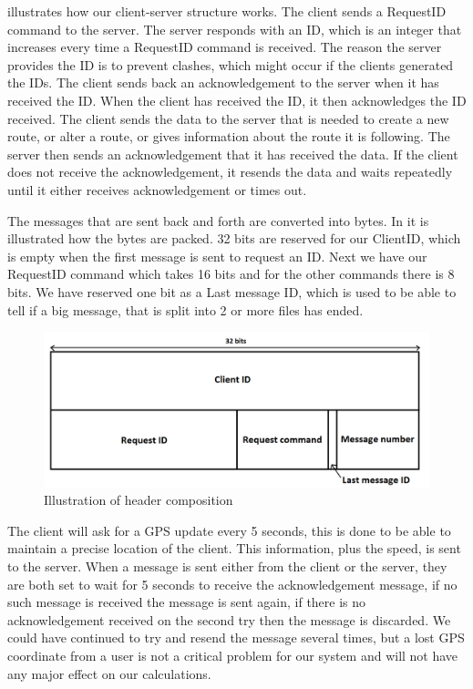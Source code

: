  illustrates how our client-server structure works.
The client sends a RequestID command to the server.
The server responds with an ID, which is an integer that increases every time a RequestID command is received.
The reason the server provides the ID is to prevent clashes, which might occur if the clients generated the IDs.
The client sends back an acknowledgement to the server when it has received the ID.
When the client has received the ID, it then acknowledges the ID received.
The client sends the data to the server that is needed to create a new route,
or alter a route, or gives information about the route it is following.
The server then sends an acknowledgement that it has received the data.
If the client does not receive the acknowledgement,
it resends the data and waits repeatedly until it either receives acknowledgement or times out. 

The messages that are sent back and forth are converted into bytes.
In  it is illustrated how the bytes are packed.
32 bits are reserved for our ClientID, which is empty when the first message is sent to request an ID.
Next we have our RequestID command which takes 16 bits and for the other commands there is 8 bits.
We have reserved one bit as a Last message ID, which is used to be able to tell if a big message,
that is split into 2 or more files has ended.

\begin{figure}[h!]
  \centering
    \includegraphics[width=1\textwidth]{figures/bytesclientserver.png}
    \caption{Illustration of header composition}
    \label{fig:bytesclientserver}
\end{figure}

The client will ask for a GPS update every 5 seconds, this is done to be able to maintain a precise location of the client. This information, plus the speed, is sent to the server.
When a message is sent either from the client or the server,
they are both set to wait for 5 seconds to receive the acknowledgement message, if no such message is received the message is sent again, if there is no acknowledgement received on the second try then the message is discarded. We could have continued to try and resend the message several times, but a lost GPS coordinate from a user is not a critical problem for our system and will not have any major effect on our calculations.


